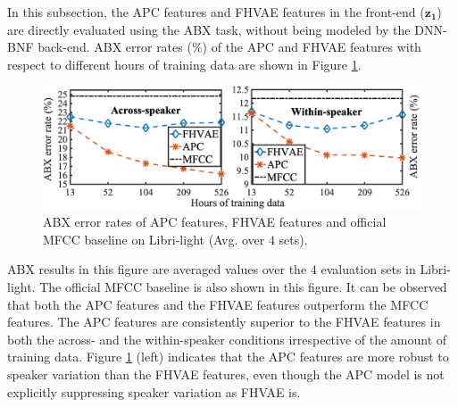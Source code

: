 \documentclass[a4paper]{article}
\begin{document}
In this subsection, the APC  features and FHVAE features in the front-end ($\bm{z_1}$)  are directly evaluated using the ABX task, without being modeled by the  DNN-BNF back-end. %
ABX error rates ($\%$) of the APC     and   FHVAE features with respect to different hours of training data  are shown in Figure \ref{fig:apc_fhvae_mfcc}.
\begin{figure}[!t]
    \centering
    \includegraphics[width=0.95\linewidth]{LaTeX/apc_fhvae_mfcc_no_sub_hori_no_hrs.png}
    \caption{ABX error rates  of APC features, FHVAE features and official MFCC baseline on Libri-light (Avg. over $4$ sets). }
    \label{fig:apc_fhvae_mfcc}
\end{figure}
ABX results in this figure are averaged values over the $4$ evaluation sets in Libri-light. The official MFCC baseline   \cite{kahn2019librilight} is also shown in this figure. It can be observed that both the APC features and the FHVAE features  outperform the MFCC features. The APC features are consistently superior to the FHVAE features in both the across- and the within-speaker conditions irrespective of the amount of training data.
Figure \ref{fig:apc_fhvae_mfcc} (left) indicates that the APC features are more robust to speaker variation than the FHVAE features, even though the APC model is not explicitly suppressing speaker variation as FHVAE is.

\end{document}
